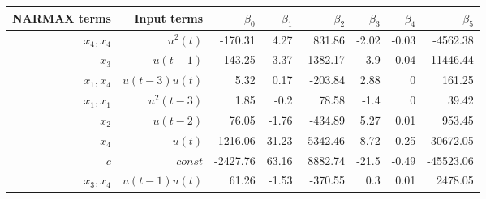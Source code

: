 \begin{tabular}{rrrrrrrr}
NARMAX terms & Input terms & $\beta_0$ & $\beta_1$ & $\beta_2$ & $\beta_3$ & $\beta_4$ & $\beta_5$ \\ 
\hline 
$x_4,x_4$ & $u^2(t)$ & -170.31 & 4.27 & 831.86 & -2.02 & -0.03 & -4562.38 \\ 
$x_3$ & $u(t-1)$& 143.25 & -3.37 & -1382.17 & -3.9 & 0.04 & 11446.44 \\ 
$x_1,x_4$ & $u(t-3)u(t)$ & 5.32 & 0.17 & -203.84 & 2.88 & 0 & 161.25 \\ 
$x_1,x_1$ & $u^2(t-3)$ & 1.85 & -0.2 & 78.58 & -1.4 & 0 & 39.42 \\ 
$x_2$ & $u(t-2)$ & 76.05 & -1.76 & -434.89 & 5.27 & 0.01 & 953.45 \\ 
$x_4$ & $u(t)$ & -1216.06 & 31.23 & 5342.46 & -8.72 & -0.25 & -30672.05 \\ 
$c$ & $const$ & -2427.76 & 63.16 & 8882.74 & -21.5 & -0.49 & -45523.06 \\ 
$x_3,x_4$ & $u(t-1)u(t)$& 61.26 & -1.53 & -370.55 & 0.3 & 0.01 & 2478.05 \\ 
\hline 
\end{tabular}